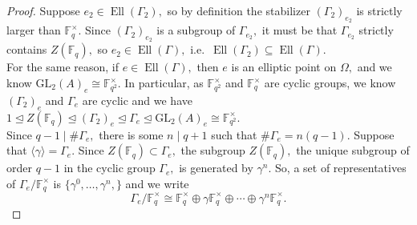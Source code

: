 \documentclass[11pt]{amsart}
\theoremstyle{definition}
\numberwithin{equation}{section}
\newcommand{\GL}{\mathrm{GL}} 	%
\newcommand{\bbF}{\mathbb{F}}		%
\begin{document}
		\begin{proof}
			Suppose $e_2\in \operatorname{Ell}(\Gamma_2),$ so by definition the stabilizer $(\Gamma_2)_{e_2}$ is strictly larger than $\bbF_q^{\times}.$ Since $(\Gamma_2)_{e_2}$ is a subgroup of $\Gamma_{e_2},$ it must be that $\Gamma_{e_2}$ strictly contains $Z(\bbF_q),$ so $e_2\in \operatorname{Ell}(\Gamma),$ i.e.\ $\operatorname{Ell}(\Gamma_2)\subseteq \operatorname{Ell}(\Gamma).$\\
			
			For the same reason, if $e\in \operatorname{Ell}(\Gamma),$ then $e$ is an elliptic point on $\Omega,$ and we know $\GL_2(A)_e\cong \bbF_{q^2}^{\times}.$  In particular, as $\bbF_{q^2}^{\times}$ and $\bbF_q^{\times}$ are cyclic groups, we know $(\Gamma_2)_e$ and $\Gamma_e$ are cyclic and we have $1\unlhd Z(\bbF_q)\unlhd (\Gamma_2)_e\unlhd \Gamma_e\unlhd \GL_2(A)_e\cong \bbF_{q^2}^{\times}.$\\
			
			Since $q-1\mid \#\Gamma_e,$ there is some $n\mid q+1$ such that $\#\Gamma_e=n(q-1).$ 
			Suppose that $\langle \gamma \rangle =\Gamma_e.$ Since $Z(\bbF_q)\subset \Gamma_e,$ the subgroup $Z(\bbF_q),$ the unique subgroup of order $q-1$ in the cyclic group $\Gamma_e,$ is generated by $\gamma^n.$ So, a set of representatives of $\Gamma_e/\bbF_q^{\times}$ is $\{\gamma^0,\ldots, \gamma^n,\}$ and we write 
			\[\Gamma_e/\bbF_q^{\times}\cong \bbF_q^{\times}\oplus \gamma\bbF_q^{\times}\oplus\cdots\oplus\gamma^n\bbF_q^{\times}.\]
			
			

\end{proof}
\end{document}
